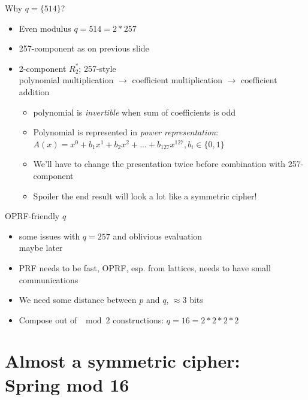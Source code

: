 \documentclass[10pt]{beamer}
\begin{document}
\begin{frame}{Why $q=\{514\}$?}
  \begin{itemize}
    \item Even modulus $q=514=2*257$\pause
    \item 257-component as on previous slide\pause
    \item 2-component $R_2^*$; 257-style\pause\\ 
      polynomial multiplication $\rightarrow$ coefficient multiplication
      $\rightarrow$ coefficient addition
      \begin{itemize}
        \item polynomial is \emph{invertible} when sum of coefficients is
          odd\pause
        \item Polynomial is represented in \emph{power representation}:
          $A(x)=x^0+b_1x^1+b_2x^2+...+b_{127}x^{127}, b_i\in \{0,1\}$\pause \\
        \item We'll have to change the presentation twice before combination with 257-component \pause
        \item \alert{Spoiler} the end result will look a lot like a symmetric
          cipher!

      \end{itemize}
  \end{itemize}
\end{frame}
 \begin{frame}{OPRF-friendly $q$}
   \begin{itemize}
     \item some issues with $q=257$ and oblivious evaluation\pause \\
       \alert{maybe later}\pause
     \item PRF needs to be fast, OPRF, esp. from lattices, needs to have small
       communications\pause
     \item We need some distance between $p$ and $q$, $\approx 3$ bits\pause
     \item Compose out of $\mod 2$ constructions: $q=16=2*2*2*2$
   \end{itemize}
 \end{frame}

 \section{Almost a symmetric cipher:\\ Spring mod 16}
\end{document}
